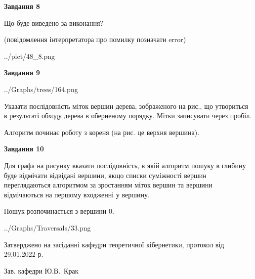 \documentclass[12pt, ukrainian]{article}
\begin{document}
{\begin {large}
{\begin {center}\textbf{Завдання 8}\end {center}}\par
Що буде виведено за виконання?\par
 (повідомлення інтерпретатора про помилку позначати error)\par
\begin{center}
	{../pict/48_8.png}
\end{center}
\newpage

{\begin {center}\textbf{Завдання 9}\end {center}}\par

\begin{center}
	{../Graphs/trees/164.png}
\end{center}
Указати послідовність міток вершин дерева, зображеного на рис., що утвориться в результаті обходу дерева в оберненому порядку. Мітки записувати через пробіл.\par Алгоритм починає роботу з кореня (на рис. це верхня вершина).\par
\newpage

{\begin {center}\textbf{Завдання 10}\end {center}}\par
Для графа на рисунку вказати послідовність, в якій алгоритм пошуку в глибину буде відмічати відвідані вершини, якщо списки суміжності вершин переглядаються алгоритмом за зростанням міток вершин та вершини відмічаються на першому вход\-женні у вершину.\par
Пошук розпочинається з вершини 0.\par

\begin{center}
	{../Graphs/Traversals/33.png}
\end{center}\par
\newpage


\end {large}
}
{\smallskip \begin {small} Затверджено на засіданні кафедри теоретичної кібернетики, протокол  від   29.01.2022 р.\par\smallskip\smallskip
{\parbox {6.5 cm}{Зав. кафедри \dotfill Ю.В.~Крак}} \end{small}}
\end{document}
